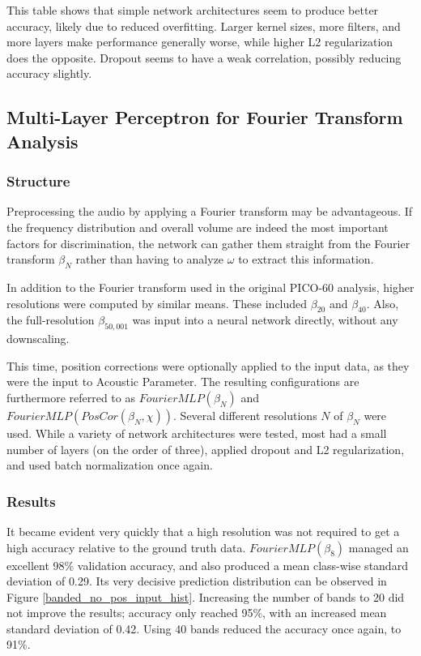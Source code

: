 \documentclass[10pt]{article}
\begin{document}
This table shows that simple network architectures seem to produce better accuracy, likely due to reduced overfitting. Larger kernel sizes, more filters, and more layers make performance generally worse, while higher L2 regularization does the opposite. Dropout seems to have a weak correlation, possibly reducing accuracy slightly.

\subsection{Multi-Layer Perceptron for Fourier Transform Analysis}

\subsubsection{Structure}

Preprocessing the audio by applying a Fourier transform may be advantageous. If the frequency distribution and overall volume are indeed the most important factors for discrimination, the network can gather them straight from the Fourier transform $\beta_{N}$ rather than having to analyze $\omega$ to extract this information.

In addition to the Fourier transform used in the original PICO-60 analysis, higher resolutions were computed by similar means. These included $\beta _{20}$ and $\beta _{40}$. Also, the full-resolution $\beta _{50,001}$ was input into a neural network directly, without any downscaling.

This time, position corrections were optionally applied to the input data, as they were the input to Acoustic Parameter. The resulting configurations are furthermore referred to as $FourierMLP(\beta_{N})$ and \\ $FourierMLP(PosCor(\beta_{N}, \chi))$. Several different resolutions $N$ of $\beta_{N}$ were used. While a variety of network architectures were tested, most had a small number of layers (on the order of three), applied dropout and L2 regularization, and used batch normalization once again.

\subsubsection{Results}

It became evident very quickly that a high resolution was not required to get a high accuracy relative to the ground truth data. $FourierMLP(\beta_{8})$ managed an excellent 98\% validation accuracy, and also produced a mean class-wise standard deviation of 0.29. Its very decisive prediction distribution can be observed in Figure \ref{banded_no_pos_input_hist}. Increasing the number of bands to 20 did not improve the results; accuracy only reached 95\%, with an increased mean standard deviation of 0.42. Using 40 bands reduced the accuracy once again, to 91\%.
\end{document}
